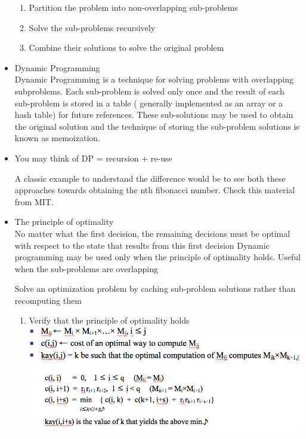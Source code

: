 \documentclass[a4paper,12pt,twoside]{book}
\begin{document}
\begin{itemize}
\begin{enumerate}
\item Partition the problem into non-overlapping sub-problems
\item Solve the sub-problems recursively
\item Combine their solutions to solve the original problem

\end{enumerate}



\item Dynamic Programming \\

Dynamic Programming is a technique for solving problems with overlapping subproblems. Each sub-problem is solved only once and the result of each sub-problem is stored in a table ( generally implemented as an array or a hash table) for future references. These sub-solutions may be used to obtain the original solution and the technique of storing the sub-problem solutions is known as memoization.

\item You may think of DP = recursion + re-use

A classic example to understand the difference would be to see both these approaches towards obtaining the nth fibonacci number. Check this material from MIT.

\item The principle of optimality \\
No matter what the first decision, the remaining decisions must be optimal with respect to the state that results from this first decision
Dynamic programming may be used only when the principle of optimality holds. Useful when the sub-problems are overlapping

Solve an optimization problem by caching  sub-problem solutions rather than recomputing them

\begin{enumerate}
\item Verify that the principle of optimality holds  \newline
\includegraphics[scale=0.45]{pics/Recurrence.png} \newline


\end{enumerate}
\end{itemize}
\end{document}
